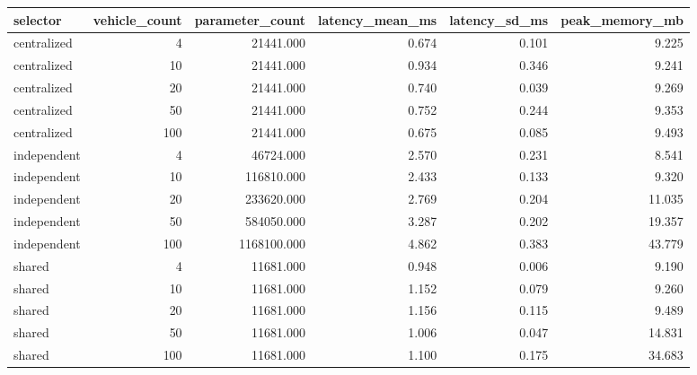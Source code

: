 \begin{tabular}{lrrrrr}
\toprule
selector & vehicle\_count & parameter\_count & latency\_mean\_ms & latency\_sd\_ms & peak\_memory\_mb \\
\midrule
centralized & 4 & 21441.000 & 0.674 & 0.101 & 9.225 \\
centralized & 10 & 21441.000 & 0.934 & 0.346 & 9.241 \\
centralized & 20 & 21441.000 & 0.740 & 0.039 & 9.269 \\
centralized & 50 & 21441.000 & 0.752 & 0.244 & 9.353 \\
centralized & 100 & 21441.000 & 0.675 & 0.085 & 9.493 \\
independent & 4 & 46724.000 & 2.570 & 0.231 & 8.541 \\
independent & 10 & 116810.000 & 2.433 & 0.133 & 9.320 \\
independent & 20 & 233620.000 & 2.769 & 0.204 & 11.035 \\
independent & 50 & 584050.000 & 3.287 & 0.202 & 19.357 \\
independent & 100 & 1168100.000 & 4.862 & 0.383 & 43.779 \\
shared & 4 & 11681.000 & 0.948 & 0.006 & 9.190 \\
shared & 10 & 11681.000 & 1.152 & 0.079 & 9.260 \\
shared & 20 & 11681.000 & 1.156 & 0.115 & 9.489 \\
shared & 50 & 11681.000 & 1.006 & 0.047 & 14.831 \\
shared & 100 & 11681.000 & 1.100 & 0.175 & 34.683 \\
\bottomrule
\end{tabular}
